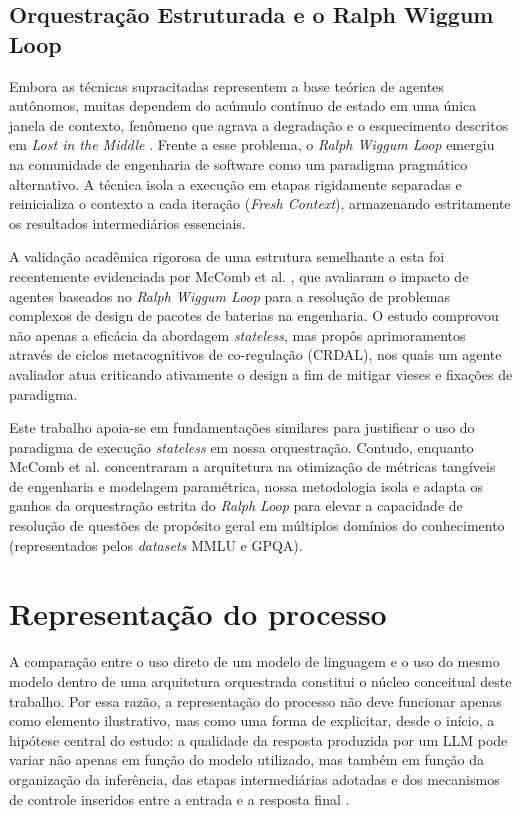 \documentclass[a4paper,10pt,twocolumn]{article}
\begin{document}
\subsection{Orquestração Estruturada e o Ralph Wiggum Loop}

Embora as técnicas supracitadas representem a base teórica de agentes autônomos, muitas dependem do acúmulo contínuo de estado em uma única janela de contexto, fenômeno que agrava a degradação e o esquecimento descritos em \textit{Lost in the Middle} \cite{liu2023lost}. Frente a esse problema, o \textit{Ralph Wiggum Loop} \cite{ghuntley2025ralph} emergiu na comunidade de engenharia de software como um paradigma pragmático alternativo. A técnica isola a execução em etapas rigidamente separadas e reinicializa o contexto a cada iteração (\textit{Fresh Context}), armazenando estritamente os resultados intermediários essenciais.

A validação acadêmica rigorosa de uma estrutura semelhante a esta foi recentemente evidenciada por McComb et al. \cite{supervising_ralph_wiggum_2026}, que avaliaram o impacto de agentes baseados no \textit{Ralph Wiggum Loop} para a resolução de problemas complexos de design de pacotes de baterias na engenharia. O estudo comprovou não apenas a eficácia da abordagem \textit{stateless}, mas propôs aprimoramentos através de ciclos metacognitivos de co-regulação (CRDAL), nos quais um agente avaliador atua criticando ativamente o design a fim de mitigar vieses e fixações de paradigma.

Este trabalho apoia-se em fundamentações similares para justificar o uso do paradigma de execução \textit{stateless} em nossa orquestração. Contudo, enquanto McComb et al. \cite{supervising_ralph_wiggum_2026} concentraram a arquitetura na otimização de métricas tangíveis de engenharia e modelagem paramétrica, nossa metodologia isola e adapta os ganhos da orquestração estrita do \textit{Ralph Loop} para elevar a capacidade de resolução de questões de propósito geral em múltiplos domínios do conhecimento (representados pelos \textit{datasets} MMLU e GPQA). 

\section{Representação do processo}

A comparação entre o uso direto de um modelo de linguagem e o uso do mesmo modelo dentro de uma arquitetura orquestrada constitui o núcleo conceitual deste trabalho. Por essa razão, a representação do processo não deve funcionar apenas como elemento ilustrativo, mas como uma forma de explicitar, desde o início, a hipótese central do estudo: a qualidade da resposta produzida por um LLM pode variar não apenas em função do modelo utilizado, mas também em função da organização da inferência, das etapas intermediárias adotadas e dos mecanismos de controle inseridos entre a entrada e a resposta final \cite{wei2022chain,yao2023tree,madaan2023selfrefine}.
\end{document}
